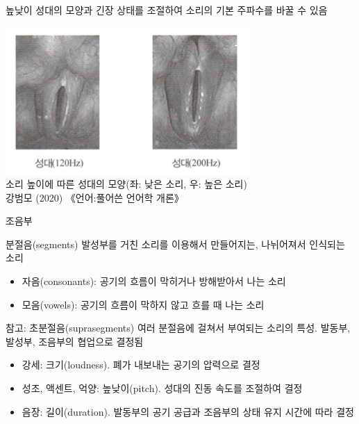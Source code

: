 \documentclass[11pt, aspectratio=169]{beamer}
\begin{document}
\begin{frame}[t]{}
    \begin{block}{높낮이}
        성대의 모양과 긴장 상태를 조절하여 소리의 기본 주파수를 바꿀 수 있음
    \end{block}
    \centering
    \includegraphics[width=0.7\textwidth]{img/vocal_folds_high_and_low_pitch.png}\\소리 높이에 따른 성대의 모양(좌: 낮은 소리, 우: 높은 소리) \\ 
    \small {강범모 (2020) 《언어:풀어쓴 언어학 개론》}   
\end{frame}

\begin{frame}[t]{조음부}
    \begin{block}{분절음(segments)}
        발성부를 거친 소리를 이용해서 만들어지는, 나뉘어져서 인식되는 소리
        \begin{itemize}
            \item 자음(consonants): 공기의 흐름이 막히거나 방해받아서 나는 소리
            \item 모음(vowels): 공기의 흐름이 막하지 않고 흐를 때 나는 소리
        \end{itemize}
    \end{block}
    \begin{block}{참고: 초분절음(suprasegments)}
        여러 분절음에 걸쳐서 부여되는 소리의 특성. 발동부, 발성부, 조음부의 협업으로 결정됨
        \begin{itemize}
            \item 강세: 크기(loudness). 폐가 내보내는 공기의 압력으로 결정
            \item 성조, 액센트, 억양: 높낮이(pitch). 성대의 진동 속도를 조절하여 결정
            \item 음장: 길이(duration). 발동부의 공기 공급과 조음부의 상태 유지 시간에 따라 결정
        \end{itemize}
    \end{block}
\end{frame}
\end{document}
